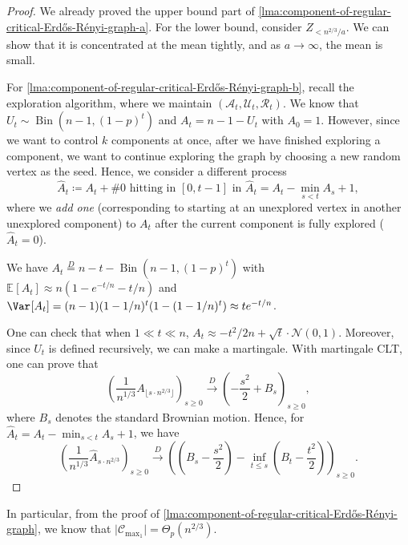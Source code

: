 \begin{proof}
	We already proved the upper bound part of \autoref{lma:component-of-regular-critical-Erdős-Rényi-graph-a}. For the lower bound, consider \(Z_{< n^{2 / 3} / a}\). We can show that it is concentrated at the mean tightly, and as \(a \to \infty \), the mean is small.

	For \autoref{lma:component-of-regular-critical-Erdős-Rényi-graph-b}, recall the exploration algorithm, where we maintain \((\mathcal{A} _t, \mathcal{U} _t, \mathcal{R} _t)\). We know that \(U_t \sim \operatorname{Bin}(n-1, (1-p)^t) \) and \(A_t = n-1-U_t\) with \(A_0 = 1\). However, since we want to control \(k\) components at once, after we have finished exploring a component, we want to continue exploring the graph by choosing a new random vertex as the seed. Hence, we consider a different process
	\[
		\hat{A} _t
		\coloneqq A_t + \text{\#0 hitting in \([0, t-1]\) in \(\hat{A}_t\)}
		= A_t - \min _{s < t} A_s + 1,
	\]
	where we \emph{add one} (corresponding to starting at an unexplored vertex in another unexplored component) to \(A_t\) after the current component is fully explored (\(\hat{A} _t = 0\)).

	\begin{prev}
		We have \(A_t \overset{D}{=} n-t-\operatorname{Bin}(n-1, (1-p)^t) \) with \(\mathbb{E}_{}[A_t] \approx n (1 - e^{- t / n} - t / n)\) and \(\Var_{}[A_t] = (n-1)(1- 1 / n)^t (1 - (1 - 1 / n)^t) \approx t e^{-t / n}\).
	\end{prev}

	One can check that when \(1 \ll t \ll n\), \(A_t \approx - t^2 / 2n + \sqrt{t} \cdot \mathcal{N} (0, 1) \). Moreover, since \(U_t\) is defined recursively, we can make a martingale. With martingale CLT, one can prove that
	\[
		\left( \frac{1}{n^{1 / 3}} A_{\lfloor s \cdot n^{2 / 3} \rfloor } \right) _{s \geq 0}
		\overset{D}{\to} \left( - \frac{s^2}{2} + B_s \right) _{s \geq 0},
	\]
	where \(B_s\) denotes the standard Brownian motion. Hence, for \(\hat{A} _t = A_t - \min _{s < t} A_s + 1\), we have
	\[
		\left( \frac{1}{n^{1 / 3}} \hat{A} _{s \cdot n^{2 / 3}} \right) _{s \geq 0}
		\overset{D}{\to} \left( \left( B_s - \frac{s^2}{2} \right) - \inf _{t \leq s} \left( B_t - \frac{t^2}{2} \right)  \right)_{s \geq 0}.
	\]
\end{proof}

In particular, from the proof of \autoref{lma:component-of-regular-critical-Erdős-Rényi-graph}, we know that \(\lvert \mathcal{C} _{\max _1} \rvert = \Theta _p(n^{2 / 3})\).

